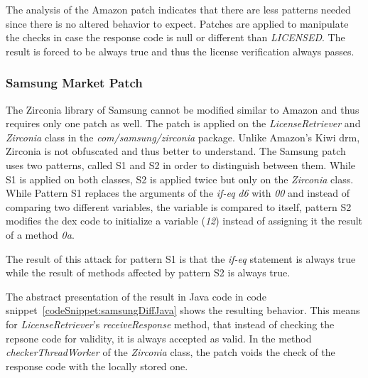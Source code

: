 The analysis of the Amazon patch indicates that there are less patterns needed since there is no altered behavior to expect.
Patches are applied to manipulate the checks in case the response code is null or different than \textit{LICENSED}.
The result is forced to be always true and thus the license verification always passes.


\subsubsection{Samsung Market Patch}
The Zirconia library of Samsung cannot be modified similar to Amazon and thus requires only one patch as well.
The patch is applied on the \textit{LicenseRetriever} and \textit{Zirconia} class in the \textit{com/samsung/zirconia} package.
Unlike Amazon's Kiwi \gls{drm}, Zirconia is not obfuscated and thus better to understand.
The Samsung patch uses two patterns, called S1 and S2 in order to distinguish between them.
While S1 is applied on both classes, S2 is applied twice but only on the \textit{Zirconia} class.
\newline
While Pattern S1 replaces the arguments of the \textit{if-eq} \textit{d6} with \textit{00} and instead of comparing two different variables, the variable is compared to itself, pattern S2 modifies the dex code to initialize a variable (\textit{12}) instead of assigning it the result of a method {\textit{0a}}.
\newline

The result of this attack for pattern S1 is that the \textit{if-eq} statement is always true while the result of methods affected by pattern S2 is always true.
\newline

The abstract presentation of the result in Java code in code snippet~\ref{codeSnippet:samsungDiffJava} shows the resulting behavior.
This means for \textit{LicenseRetriever}'s \textit{receiveResponse} method, that instead of checking the repsone code for validity, it is always accepted as valid.
In the method \textit{checkerThreadWorker} of the \textit{Zirconia} class, the patch voids the check of the response code with the locally stored one.
